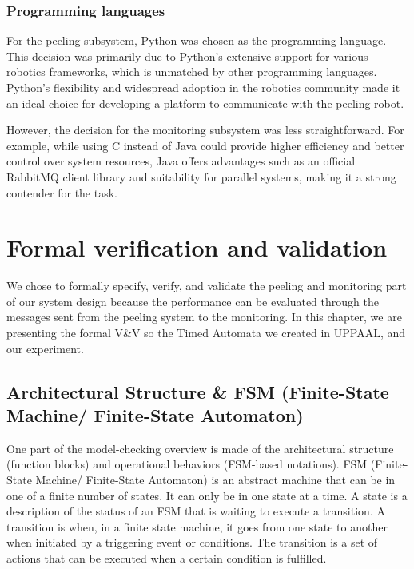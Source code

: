 \documentclass[conference]{IEEEtran}
\begin{document}
\subsubsection{Programming languages}
For the peeling subsystem, Python was chosen as the programming language. This decision was primarily due to Python's extensive support for various robotics frameworks, which is unmatched by other programming languages. Python's flexibility and widespread adoption in the robotics community made it an ideal choice for developing a platform to communicate with the peeling robot.

However, the decision for the monitoring subsystem was less straightforward. For example, while using C instead of Java could provide higher efficiency and better control over system resources, Java offers advantages such as an official RabbitMQ client library and suitability for parallel systems, making it a strong contender for the task.

\section{Formal verification and validation }


\color{black}

We chose to formally specify, verify, and validate the peeling and monitoring part of our system design because the performance can be evaluated through the messages sent from the peeling system to the monitoring.
In this chapter, we are presenting the formal V\&V so the Timed Automata we created in UPPAAL, and our experiment.
\subsection{Architectural Structure \& FSM (Finite-State Machine/ Finite-State Automaton) \cite{b7}}
One part of the model-checking overview is made of the architectural structure (function blocks) and operational behaviors (FSM-based notations).
FSM (Finite-State Machine/ Finite-State Automaton) is an abstract machine that can be in one of a finite number of states. It can only be in one state at a time. A state is a description of the status of an FSM that is waiting to execute a transition. A transition is when, in a finite state machine, it goes from one state to another when initiated by a triggering event or conditions. The transition is a set of actions that can be executed when a certain condition is fulfilled.   
\end{document}
